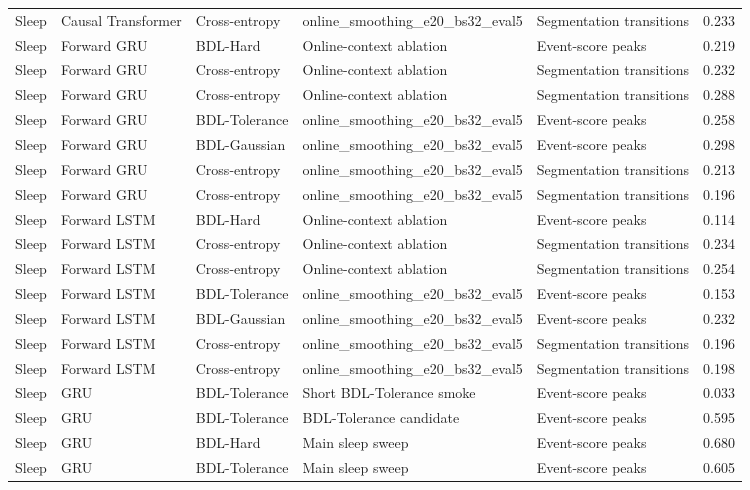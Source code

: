 \begin{tabular}{llllll}
Sleep & Causal Transformer & Cross-entropy & online\_smoothing\_e20\_bs32\_eval5 & Segmentation transitions & 0.233 \\
Sleep & Forward GRU & BDL-Hard & Online-context ablation & Event-score peaks & 0.219 \\
Sleep & Forward GRU & Cross-entropy & Online-context ablation & Segmentation transitions & 0.232 \\
Sleep & Forward GRU & Cross-entropy & Online-context ablation & Segmentation transitions & 0.288 \\
Sleep & Forward GRU & BDL-Tolerance & online\_smoothing\_e20\_bs32\_eval5 & Event-score peaks & 0.258 \\
Sleep & Forward GRU & BDL-Gaussian & online\_smoothing\_e20\_bs32\_eval5 & Event-score peaks & 0.298 \\
Sleep & Forward GRU & Cross-entropy & online\_smoothing\_e20\_bs32\_eval5 & Segmentation transitions & 0.213 \\
Sleep & Forward GRU & Cross-entropy & online\_smoothing\_e20\_bs32\_eval5 & Segmentation transitions & 0.196 \\
Sleep & Forward LSTM & BDL-Hard & Online-context ablation & Event-score peaks & 0.114 \\
Sleep & Forward LSTM & Cross-entropy & Online-context ablation & Segmentation transitions & 0.234 \\
Sleep & Forward LSTM & Cross-entropy & Online-context ablation & Segmentation transitions & 0.254 \\
Sleep & Forward LSTM & BDL-Tolerance & online\_smoothing\_e20\_bs32\_eval5 & Event-score peaks & 0.153 \\
Sleep & Forward LSTM & BDL-Gaussian & online\_smoothing\_e20\_bs32\_eval5 & Event-score peaks & 0.232 \\
Sleep & Forward LSTM & Cross-entropy & online\_smoothing\_e20\_bs32\_eval5 & Segmentation transitions & 0.196 \\
Sleep & Forward LSTM & Cross-entropy & online\_smoothing\_e20\_bs32\_eval5 & Segmentation transitions & 0.198 \\
Sleep & GRU & BDL-Tolerance & Short BDL-Tolerance smoke & Event-score peaks & 0.033 \\
Sleep & GRU & BDL-Tolerance & BDL-Tolerance candidate & Event-score peaks & 0.595 \\
Sleep & GRU & BDL-Hard & Main sleep sweep & Event-score peaks & 0.680 \\
Sleep & GRU & BDL-Tolerance & Main sleep sweep & Event-score peaks & 0.605 \\

\end{tabular}
